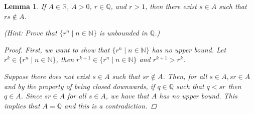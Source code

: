 \documentclass[11pt]{article}
\newcommand{\bbN}{\mathbb{N}}
\newcommand{\bbQ}{\mathbb{Q}}
\newcommand{\bbR}{\mathbb{R}}
\newtheorem{lemma}[theorem]{Lemma}
\theoremstyle{definition}
\numberwithin{equation}{subsection}
\begin{document}
\begin{lemma}
	If $A \in \bbR$, $A > 0$, $r \in \bbQ$, and $r > 1$, then there exist $s\in A$ such that $rs\not\in A$.
	

	(Hint: Prove that $\{r^n \mid n \in \bbN\}$ is unbounded in $\bbQ$.)

        
\begin{proof}
First, we want to show that $\{r^n \mid n \in \bbN\}$ has no upper bound. Let $r^k \in \{r^n \mid n \in \bbN\}$, then $r^{k+1} \in \{r^n \mid n \in \bbN\}$ and $r^{k+1}>r^k$.

Suppose there does not exist $s \in A$ such that $sr \notin A$. Then, for all $s\in A, sr \in A$ and by the property of being closed downwards, if $q \in \bbQ$ such that $q<sr$ then $q \in A$. Since $sr \in A$ for all $s \in A$, we have that $A$ has no upper bound. This implies that $A =\bbQ$ and this is a contradiction.

\renewcommand\qedsymbol{QED}
\end{proof}

\end{lemma}
\end{document}
